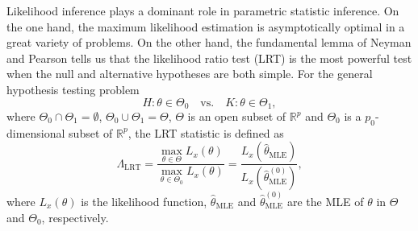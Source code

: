 \documentclass[11pt]{article}
\theoremstyle{plain}
\theoremstyle{definition}
\theoremstyle{remark}
\begin{document}







%
Likelihood inference plays a dominant role in parametric statistic inference.
On the one hand, the maximum likelihood estimation is asymptotically optimal in a great variety of problems.
On the other hand, the fundamental lemma of Neyman and Pearson tells us that the likelihood ratio test (LRT) is the most powerful test when the null and alternative hypotheses are both simple.
For the general hypothesis testing problem
\begin{equation}\label{eq:newHy}
    H:\theta\in\Theta_0\quad \text{vs.}\quad K: \theta\in \Theta_1,
\end{equation}
where $\Theta_0\cap \Theta_1=\emptyset$, $\Theta_0\cup \Theta_1=\Theta$, $\Theta$ is an open subset of $\mathbb{R}^p$ and $\Theta_0$ is a $p_0$-dimensional subset of $\mathbb{R}^p$,
the LRT statistic is defined as
\begin{equation*}
    \Lambda_{\text{LRT}}=\frac{\max_{\theta\in\Theta}L_x(\theta)}{\max_{\theta\in\Theta_0} L_x(\theta)}=\frac{L_x(\hat{\theta}_{\text{MLE}})}{ L_x(\hat{\theta}^{(0)}_{\text{MLE}})},
\end{equation*}
where $L_x(\theta)$ is the likelihood function, $\hat{\theta}_{\text{MLE}}$ and $\hat{\theta}^{(0)}_{\text{MLE}}$ are the MLE of $\theta$ in $\Theta$ and $\Theta_0$, respectively.
\end{document}

